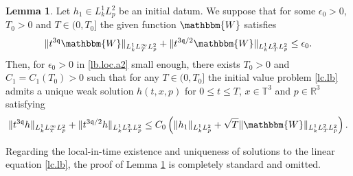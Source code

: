 \documentclass[reqno]{amsart}
\newcommand{\pv}{p}
\def\R{\mathbb R}
\newcommand{\qq}{\mathfrak{q}}
\newcommand{\tTq}{t^{3\qq}}
\newcommand{\T}{\mathbb{T}}
\newcommand{\hh}{\mathbbm{W}}
\theoremstyle{definition}
\newtheorem{lemma}[theorem]{Lemma}
\numberwithin{equation}{section}
\numberwithin{theorem}{section}
\begin{document}
\begin{lemma}\label{lb.loc}
Let \(h_{1}\in L^1_{k}L^2_{\pv}\) be an initial datum. We suppose that for some $\epsilon_0>0$, $T_0>0$ and $T\in (0,T_0]$ the given function ${\hh}$ satisfies
\begin{equation}
\label{lb.loc.a2}
\| \tTq {\hh}\|_{ L^1_{k}L^\infty_{T}L^2_{\pv}}+\|t^{3\qq/2}{\hh}\|_{L^1_{k}L^2_{T}L^2_{\pv}}\leq \epsilon_0.
\end{equation}
Then, for $\epsilon_0>0$ in \eqref{lb.loc.a2} small enough, there exists $T_0>0$ and $C_1=C_1(T_0)>0$ such that for any $T\in (0,T_0]$ the initial value problem \eqref{lc.lb} admits a unique weak solution $h(t,x,\pv)$ for $0\leq t\leq T$, $x\in  \T^3$ and $\pv\in \R^3$ satisfying
\begin{align}\notag 
    \| \tTq h\|_{L^1_{k}L^\infty_{T}L^2_{\pv}}+\| t^{3\qq/2}  h\|_{ L^1_{k}L^2_{T}L^2_{\pv}}
\leq C_0\left(\|h_{1}\|_{L^1_{k}L^2_{\pv}}+\sqrt{T}\|{\hh}\|_{ L^1_{k}L^2_{T}L^2_{\pv}}\right).
\end{align}
\end{lemma}

Regarding the local-in-time existence and uniqueness of solutions to the linear equation \eqref{lc.lb}, the proof of Lemma \ref{lb.loc} is completely standard and omitted.
\end{document}
